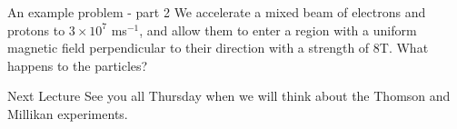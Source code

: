 \begin{frame}{An example problem - part 2}
\small
We accelerate a mixed beam of electrons and protons to $3 \times 10^7$ ms$^{-1}$, and allow them to enter a region with a uniform magnetic field perpendicular to their direction with a strength of 8T. What happens to the particles?\\[21ex]

%
%
%
\end{frame}


\begin{frame}{Next Lecture}
\small
See you all Thursday when we will think about the Thomson and Millikan experiments.
\end{frame}


